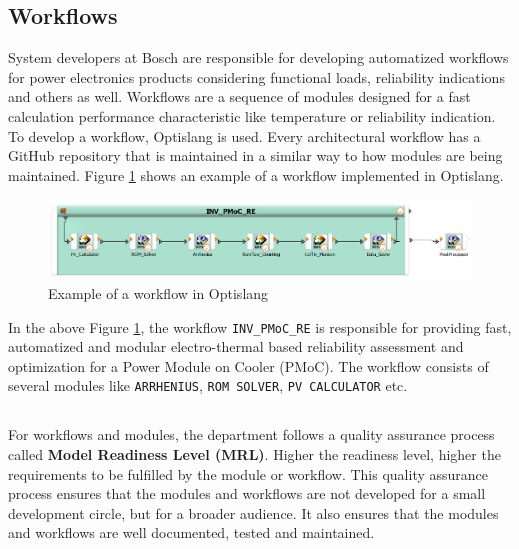 \subsection{Workflows}
System developers at Bosch are responsible for developing automatized workflows for power electronics products considering functional loads, reliability indications and others as well. Workflows 
are a sequence of modules designed for a fast calculation performance characteristic like temperature or reliability indication. To develop a workflow, 
Optislang is used. Every architectural workflow has a GitHub repository 
that is maintained in a similar way to how modules are being maintained. Figure \ref{workflow_example} shows an example of a workflow implemented in Optislang.
\begin{figure}[!h]
    \centering
    \includegraphics[width=\textwidth]{Images/workflow_example.png}
    \caption{Example of a workflow in Optislang}
    \label{workflow_example}
\end{figure}

In the above Figure \ref{workflow_example}, the workflow \texttt{INV\_PMoC\_RE} is responsible for providing fast, automatized and modular electro-thermal based 
reliability assessment and optimization for a Power Module on Cooler (PMoC). The workflow consists of several modules like \texttt{ARRHENIUS}, \texttt{ROM SOLVER},
\texttt{PV CALCULATOR} etc.
\subsection*{}
For workflows and modules, the department follows a quality assurance process called \textbf{Model Readiness Level (MRL)}. Higher the readiness level, higher
the requirements to be fulfilled by the module or workflow. This quality assurance process ensures that the modules and workflows are not developed for a small development 
circle, but for a broader audience. It also ensures that the modules and workflows are well documented, tested and maintained.

